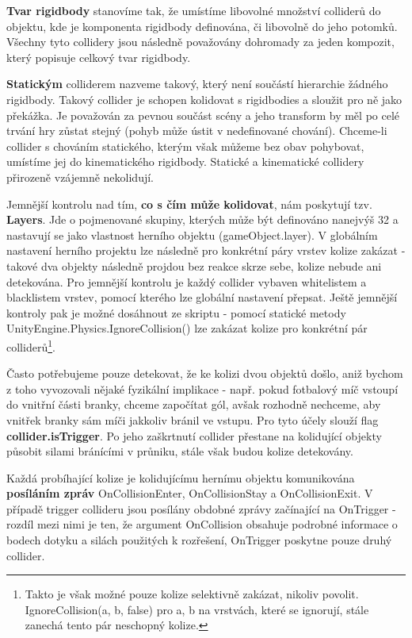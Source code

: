 \textbf{Tvar rigidbody} stanovíme tak, že umístíme libovolné množství colliderů do objektu, kde je komponenta rigidbody definována, či libovolně do jeho potomků. Všechny tyto collidery jsou následně považovány dohromady za jeden kompozit, který popisuje celkový tvar rigidbody. 

\textbf{Statickým} colliderem nazveme takový, který není součástí hierarchie žádného rigidbody. Takový collider je schopen kolidovat s rigidbodies a sloužit pro ně jako překážka. Je považován za pevnou součást scény a jeho transform by měl po celé trvání hry zůstat stejný (pohyb může ústit v nedefinované chování). Chceme-li collider s chováním statického, kterým však můžeme bez obav pohybovat, umístíme jej do kinematického rigidbody. Statické a kinematické collidery přirozeně vzájemně nekolidují.

Jemnější kontrolu nad tím, \textbf{co s čím může kolidovat}, nám poskytují tzv. \textbf{Layers}. Jde o pojmenované skupiny, kterých může být definováno nanejvýš 32 a nastavují se jako vlastnost herního objektu (gameObject.layer). V globálním nastavení herního projektu lze následně pro konkrétní páry vrstev kolize zakázat - takové dva objekty následně projdou bez reakce skrze sebe, kolize nebude ani detekována. Pro jemnější kontrolu je každý collider vybaven whitelistem a blacklistem vrstev, pomocí kterého lze globální nastavení přepsat. Ještě jemnější kontroly pak je možné dosáhnout ze skriptu - pomocí statické metody UnityEngine.Physics.IgnoreCollision() lze zakázat kolize pro konkrétní pár colliderů\footnote{Takto je však možné pouze kolize selektivně zakázat, nikoliv povolit. IgnoreCollision(a, b, false) pro a, b na vrstvách, které se ignorují, stále zanechá tento pár neschopný kolize.}.

Často potřebujeme pouze detekovat, že ke kolizi dvou objektů došlo, aniž bychom z toho vyvozovali nějaké fyzikální implikace - např. pokud fotbalový míč vstoupí do vnitřní části branky, chceme započítat gól, avšak rozhodně nechceme, aby vnitřek branky sám míči jakkoliv bránil ve vstupu. Pro tyto účely slouží flag \textbf{collider.isTrigger}. Po jeho zaškrtnutí collider přestane na kolidující objekty působit silami bránícími v průniku, stále však budou kolize detekovány.

Každá probíhající kolize je kolidujícímu hernímu objektu komunikována \textbf{posíláním zpráv} OnCollisionEnter, OnCollisionStay a OnCollisionExit. V případě trigger collideru jsou posílány obdobné zprávy začínající na OnTrigger - rozdíl mezi nimi je ten, že argument OnCollision obsahuje podrobné informace o bodech dotyku a silách použitých k rozřešení, OnTrigger poskytne pouze druhý collider. 

